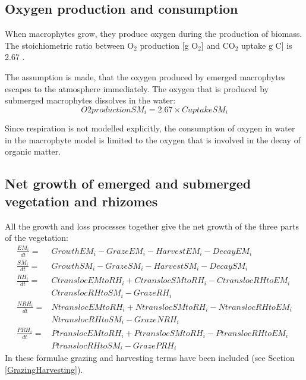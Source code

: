 \subsection{Oxygen production and consumption}
When macrophytes grow, they produce oxygen during the production of biomass. The stoichiometric ratio between
O$_2$ production [g O$_2$] and CO$_2$ uptake g C] is 2.67 \citep{}.

The assumption is made, that the oxygen produced by emerged macrophytes escapes to the atmosphere immediately.
The oxygen that is produced by submerged macrophytes dissolves in the water:
%
\begin{equation}
    O2productionSM_i = 2.67 \times CuptakeSM_i
\end{equation}

Since respiration is not modelled explicitly, the consumption of oxygen in water in the macrophyte model is
limited to the oxygen that is involved in the decay of organic matter.

\subsection{Net growth of emerged and submerged vegetation and rhizomes}
All the growth and loss processes together give the net growth of the three parts of the vegetation:
\begin{align}
\nonumber    \frac{EM_i}{dt}  =& GrowthEM_i - GrazeEM_i - HarvestEM_i - DecayEM_i           \\
\nonumber    \frac{SM_i}{dt}  =& GrowthSM_i - GrazeSM_i - HarvestSM_i - DecaySM_i           \\
\nonumber    \frac{RH_i}{dt}  =& CtranslocEMtoRH_i + CtranslocSMtoRH_i - CtranslocRHtoEM_i  \\
\nonumber                      & CtranslocRHtoSM_i - GrazeRH_i                              \\
\nonumber    \frac{NRH_i}{dt} =& NtranslocEMtoRH_i + NtranslocSMtoRH_i - NtranslocRHtoEM_i  \\
\nonumber                      & NtranslocRHtoSM_i - GrazeNRH_i                             \\
\nonumber    \frac{PRH_i}{dt} =& PtranslocEMtoRH_i + PtranslocSMtoRH_i - PtranslocRHtoEM_i  \\
                               & PtranslocRHtoSM_i - GrazePRH_i
\end{align}
In these formulae grazing and harvesting terms have been included (see Section \ref{GrazingHarvesting}).
